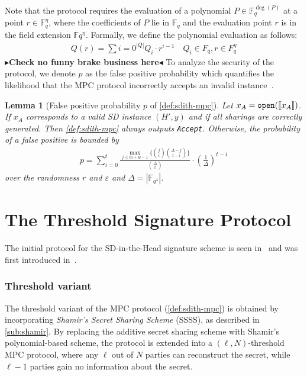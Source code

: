 \documentclass[11pt]{report}
\theoremstyle{definition}
\theoremstyle{plain}
\newtheorem{lemma}{Lemma}[section]
\newcommand{\todo}[1]{{\color[rgb]{.5,0,0}\textbf{$\blacktriangleright$#1$\blacktriangleleft$}}}
\begin{document}
Note that the protocol requires the evaluation of a polynomial $P \in \mathbb{F}_q^{\deg(P)}$ at a point $r \in \mathbb{F}_q^\eta$, where the coefficients of $P$ lie in $\mathbb{F}_q$ and the evaluation point $r$ is in the field extension $\mathbb{F}q^\eta$. Formally, we define the polynomial evaluation as follows:
\begin{align}
  Q(r)  = \textstyle\sum{i=0}^{|Q|} Q_i \cdot r^{i-1}  \quad Q_i \in F_q, r \in F_q^\eta\label{eq:sdith_mpc_polynomial_eval}
\end{align}
\todo{Check no funny brake business here}
To analyze the security of the protocol, we denote $p$ as the false positive probability which quantifies the likelihood that the MPC protocol incorrectly accepts an invalid instance~\cite{feneuil2022syndrome,aguilarsyndrome11}.

\begin{lemma}[False positive probability $p$ of \autoref{def:sdith-mpc}]\label{lem:sdith-mpc-soundness}
  Let $x_A = \texttt{open}(\llbracket x_A \rrbracket)$. If $x_A$ corresponds to a valid SD instance $(H', y)$ and if all sharings are correctly generated. Then \autoref{def:sdith-mpc} always outputs \texttt{Accept}.
  Otherwise, the probability of a false positive is bounded by
  \begin{align*}
    p = \sum_{i=0}^t \frac{\max_{j \leq m + w -1} \{ \binom{j}{i} \binom{\Delta - j}{t-i} \}}{\binom{\Delta}{t}} \cdot \left(\frac{1}{\Delta}\right)^{t-i}
  \end{align*} over the randomness $r$ and $\varepsilon$ and $\Delta = |\mathbb{F}_{q^4}|$.
\end{lemma}

\section{The Threshold Signature Protocol}\label{sec:sdith-signature}

The initial protocol for the SD-in-the-Head signature scheme is seen in~\cite[Figure 1]{aguilarsyndrome11} and was first introduced in~\cite[Figure 1, p19]{feneuil2022syndrome}.

\subsubsection{Threshold variant}\label{sub:sdith-threshold-sss}

The threshold variant of the MPC protocol (\autoref{def:sdith-mpc}) is obtained by incorporating \textit{Shamir's Secret Sharing Scheme} (SSSS), as described in \autoref{sub:shamir}. By replacing the additive secret sharing scheme with Shamir's polynomial-based scheme, the protocol is extended into a $(\ell, N)$-threshold MPC protocol, where any $\ell$ out of $N$ parties can reconstruct the secret, while $\ell-1$ parties gain no information about the secret.
\end{document}
